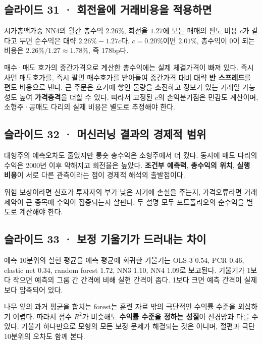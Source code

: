 \documentclass[11pt,a4paper]{article}
\begin{document}
\subsection{슬라이드 31 · 회전율에 거래비용을 적용하면}
시가총액가중 NN4의 월간 총수익 $2.26\%$, 회전율 $1.27$에 모든 매매의 편도 비용 $c$가 같다고 두면 순수익은 대략 $2.26\%-1.27c$다. $c=0.20\%$이면 $2.01\%$, 총수익이 0이 되는 비용은 $2.26\%/1.27\approx1.78\%$, 즉 178bp다.\par

매수·매도 호가의 중간가격으로 계산한 총수익에는 실제 체결가격이 빠져 있다. 즉시 사면 매도호가를, 즉시 팔면 매수호가를 받아들여 중간가격 대비 대략 \textbf{반 스프레드}를 편도 비용으로 낸다. 큰 주문은 호가에 쌓인 물량을 소진하고 정보가 있는 거래일 가능성도 높여 \textbf{가격충격}을 더할 수 있다. 따라서 고정된 $c$의 손익분기점은 민감도 계산이며, 소형주·공매도 다리의 실제 비용은 별도로 추정해야 한다.\par

\subsection{슬라이드 32 · 머신러닝 결과의 경제적 범위}
대형주의 예측오차도 줄었지만 롱숏 총수익은 소형주에서 더 컸다. 동시에 매도 다리의 수익은 2000년 이후 약해지고 회전율은 높았다. \textbf{조건부 예측력}, \textbf{총수익의 위치}, \textbf{실행 비용}이 서로 다른 관측이라는 점이 경제적 해석의 출발점이다.\par

위험 보상이라면 신호가 투자자의 부가 낮은 시기에 손실을 주는지, 가격오류라면 거래 제약이 큰 종목에 수익이 집중되는지 살핀다. 두 설명 모두 포트폴리오의 순수익을 별도로 계산해야 한다.\par

\subsection{슬라이드 33 · 보정 기울기가 드러내는 차이}
예측 10분위의 실현 평균을 예측 평균에 회귀한 기울기는 OLS-3 $0.54$, PCR $0.46$, elastic net $0.34$, random forest $1.72$, NN3 $1.10$, NN4 $1.09$로 보고된다. 기울기가 1보다 작으면 예측의 그룹 간 간격에 비해 실현 간격이 좁다. 1보다 크면 예측 간격이 실제보다 압축되어 있다.\par

나무 잎의 과거 평균을 합치는 forest는 훈련 자료 밖의 극단적인 수익률 수준을 외삽하기 어렵다. 따라서 점수 $R^2$가 비슷해도 \textbf{수익률 수준을 정하는 성질}이 신경망과 다를 수 있다. 기울기 하나만으로 모형의 모든 보정 문제가 해결되는 것은 아니며, 절편과 극단 10분위의 오차도 함께 본다.\par
\end{document}
